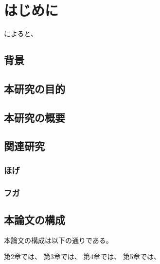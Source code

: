 \chapter{はじめに}

\cite{oomukai}によると、

\section{背景}

\section{本研究の目的}

\section{本研究の概要}

\section{関連研究}

\subsection{ほげ}

\subsection{フガ}

\section{本論文の構成}
本論文の構成は以下の通りである。

第2章では、
第3章では、
第4章では、
第5章では、
